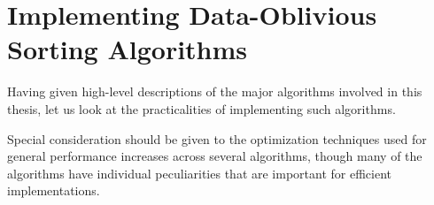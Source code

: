 \chapter{Implementing Data-Oblivious Sorting Algorithms}
\label{ch:Implementations}

Having given high-level descriptions of the major algorithms involved in this thesis, let us look at the practicalities of implementing such algorithms.

Special consideration should be given to the optimization techniques used for general performance increases across several algorithms, though many of the algorithms have individual peculiarities that are important for efficient implementations.












